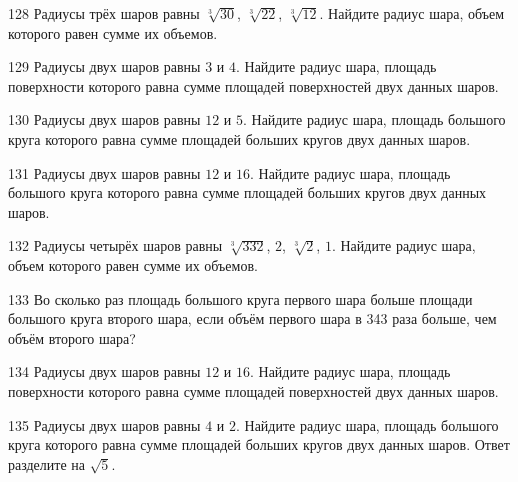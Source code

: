 \documentclass[a4paper]{article}
\begin{document}
\begin{taskBN}{128}
Радиусы трёх шаров равны $\sqrt[3]{30}$, $\sqrt[3]{22}$, $\sqrt[3]{12}$. Найдите радиус шара, объем которого равен сумме их объемов.
\end{taskBN}

\begin{taskBN}{129}
Радиусы двух шаров равны $3$ и $4$. Найдите радиус шара, площадь поверхности которого равна сумме площадей поверхностей двух данных шаров.
\end{taskBN}

\begin{taskBN}{130}
Радиусы двух шаров равны $12$ и $5$. Найдите радиус шара, площадь большого круга которого равна сумме площадей больших кругов двух данных шаров.
\end{taskBN}

\begin{taskBN}{131}
Радиусы двух шаров равны $12$ и $16$. Найдите радиус шара, площадь большого круга которого равна сумме площадей больших кругов двух данных шаров.
\end{taskBN}

\begin{taskBN}{132}
Радиусы четырёх шаров равны $\sqrt[3]{332}$, $2$, $\sqrt[3]{2}$, $1$. Найдите радиус шара, объем которого равен сумме их объемов.
\end{taskBN}

\begin{taskBN}{133}
Во сколько раз площадь большого круга первого шара больше площади большого круга второго шара, если объём первого шара в 343 раза больше, чем объём второго шара?
\end{taskBN}

\begin{taskBN}{134}
Радиусы двух шаров равны $12$ и $16$. Найдите радиус шара, площадь поверхности которого равна сумме площадей поверхностей двух данных шаров.
\end{taskBN}

\begin{taskBN}{135}
Радиусы двух шаров равны $4$ и $2$. Найдите радиус шара, площадь большого круга которого равна сумме площадей больших кругов двух данных шаров. Ответ разделите на $\sqrt{5}$.
\end{taskBN}
\end{document}
